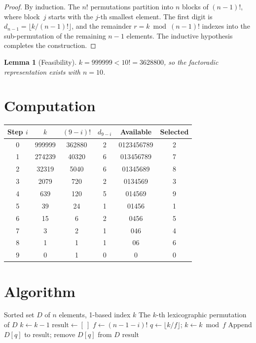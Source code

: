 \documentclass[12pt,a4paper]{article}
\newtheorem{lemma}[theorem]{Lemma}
\theoremstyle{definition}
\theoremstyle{remark}
\begin{document}
\begin{proof}
By induction. The $n!$ permutations partition into $n$ blocks of $(n-1)!$, where block~$j$ starts with the $j$-th smallest element. The first digit is $d_{n-1} = \lfloor k/(n-1)!\rfloor$, and the remainder $r = k \bmod (n-1)!$ indexes into the sub-permutation of the remaining $n-1$ elements. The inductive hypothesis completes the construction.
\end{proof}

\begin{lemma}[Feasibility]
$k = 999999 < 10! = 3628800$, so the factoradic representation exists with $n = 10$.
\end{lemma}

\section{Computation}

\begin{center}
\begin{tabular}{@{}cccccc@{}}
\toprule
Step $i$ & $k$ & $(9{-}i)!$ & $d_{9-i}$ & Available & Selected \\
\midrule
0 & 999999 & 362880 & 2 & 0123456789 & 2 \\
1 & 274239 & 40320 & 6 & 013456789 & 7 \\
2 & 32319 & 5040 & 6 & 01345689 & 8 \\
3 & 2079 & 720 & 2 & 0134569 & 3 \\
4 & 639 & 120 & 5 & 014569 & 9 \\
5 & 39 & 24 & 1 & 01456 & 1 \\
6 & 15 & 6 & 2 & 0456 & 5 \\
7 & 3 & 2 & 1 & 046 & 4 \\
8 & 1 & 1 & 1 & 06 & 6 \\
9 & 0 & 1 & 0 & 0 & 0 \\
\bottomrule
\end{tabular}
\end{center}

\section{Algorithm}

\begin{algorithm}[H]
\caption{$k$-th Lexicographic Permutation}
\begin{algorithmic}[1]
\REQUIRE Sorted set $D$ of $n$ elements, 1-based index $k$
\ENSURE The $k$-th lexicographic permutation of $D$
\STATE $k \gets k - 1$ 
\STATE $\mathrm{result} \gets [\ ]$
    \STATE $f \gets (n - 1 - i)!$
    \STATE $q \gets \lfloor k / f \rfloor$; \quad $k \gets k \bmod f$
    \STATE Append $D[q]$ to $\mathrm{result}$; remove $D[q]$ from $D$
\ENDFOR
\RETURN $\mathrm{result}$
\end{algorithmic}
\end{algorithm}
\end{document}
